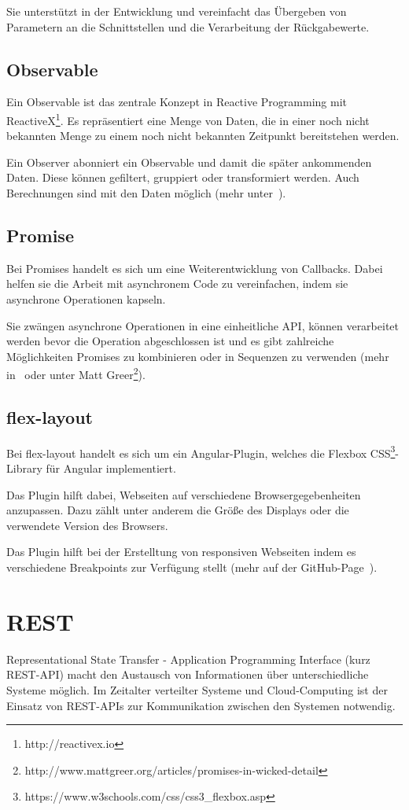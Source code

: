 Sie unterstützt in der Entwicklung und vereinfacht das Übergeben von Parametern an die Schnittstellen und die
Verarbeitung der Rückgabewerte.

\subsection{Observable}
Ein Observable ist das zentrale Konzept in Reactive Programming mit ReactiveX\footnote{http://reactivex.io}. Es
repräsentiert eine Menge von Daten, die in einer noch nicht bekannten Menge zu einem noch nicht bekannten Zeitpunkt
bereitstehen werden.

Ein Observer abonniert ein Observable und damit die später ankommenden Daten. Diese können gefiltert, gruppiert oder
transformiert werden. Auch Berechnungen sind mit den Daten möglich (mehr unter~\cite{book_grundlagen_observable}).

\subsection{Promise}
Bei Promises handelt es sich um eine Weiterentwicklung von Callbacks. Dabei helfen sie die Arbeit mit asynchronem Code
zu vereinfachen, indem sie asynchrone Operationen kapseln.

Sie zwängen asynchrone Operationen in eine einheitliche API, können verarbeitet werden bevor die Operation abgeschlossen
ist und es gibt zahlreiche Möglichkeiten Promises zu kombinieren oder in Sequenzen zu verwenden (mehr
in~\cite{book_grundlagen_promises} oder unter Matt Greer\footnote{http://www.mattgreer.org/articles/promises-in-wicked-detail}).

\subsection{flex-layout}
Bei flex-layout handelt es sich um ein Angular-Plugin, welches die Flexbox
CSS\footnote{https://www.w3schools.com/css/css3\_flexbox.asp}-Library für Angular implementiert.

Das Plugin hilft dabei, Webseiten auf verschiedene Browsergegebenheiten anzupassen. Dazu zählt unter anderem die Größe
des Displays oder die verwendete Version des Browsers.

Das Plugin hilft bei der Erstelltung von responsiven Webseiten indem es verschiedene Breakpoints zur Verfügung stellt
(mehr auf der GitHub-Page~\cite{online_grundlagen_flexlayout}).

\section{REST}
Representational State Transfer - Application Programming Interface (kurz REST-API) macht den Austausch von Informationen
über unterschiedliche Systeme möglich. Im Zeitalter verteilter Systeme und Cloud-Computing ist der Einsatz von REST-APIs
zur Kommunikation zwischen den Systemen notwendig.

